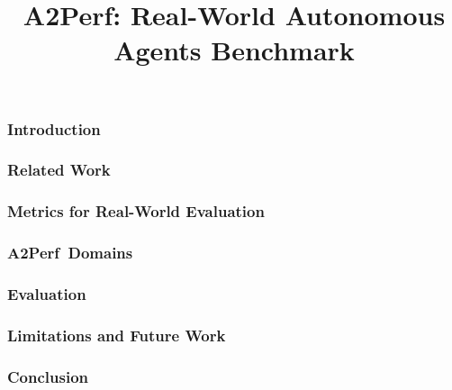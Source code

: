 \documentclass[10pt]{article} %
\title{A2Perf: Real-World Autonomous Agents Benchmark}
\newcommand{\method}{A2Perf\xspace}
\begin{document}
\maketitle

\doparttoc %
\faketableofcontents %

\part{} %


\begin{abstract}

\end{abstract}

\section{Introduction}

\label{sec:introduction}




\section{Related Work}
\label{sec:related_work}



\section{Metrics for Real-World Evaluation}
\label{sec:metrics}



\section{\method~Domains}
\label{sec:domain_background}

\section{Evaluation}
\label{sec:evaluation}

\section{Limitations and Future Work}
\label{sec:limitations_and_future_work}

\section{Conclusion}
\label{sec:conclusion}





\appendix

\end{document}
